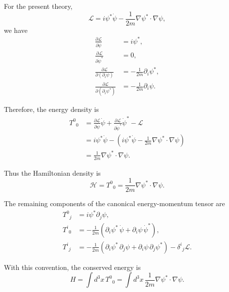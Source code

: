 \documentclass{article}
\newcommand{\lagrangian}{\mathcal{L}}
\begin{document}
For the present theory,
\begin{equation}
\lagrangian
=
i\psi^*\dot{\psi}
-
\frac{1}{2m}\nabla\psi^*\cdot\nabla\psi ,
\end{equation}
we have
\begin{equation}
\begin{split}
\frac{\partial \lagrangian}{\partial \dot{\psi}}
&=
i\psi^*,
\\
\frac{\partial \lagrangian}{\partial \dot{\psi}^*}
&=
0,
\\
\frac{\partial \lagrangian}{\partial(\partial_i\psi)}
&=
-\frac{1}{2m}\partial_i\psi^*,
\\
\frac{\partial \lagrangian}{\partial(\partial_i\psi^*)}
&=
-\frac{1}{2m}\partial_i\psi .
\end{split}
\end{equation}

Therefore, the energy density is
\begin{equation}
\begin{split}
T^0{}_0
&=
\frac{\partial \lagrangian}{\partial \dot{\psi}}\dot{\psi}
+
\frac{\partial \lagrangian}{\partial \dot{\psi}^*}\dot{\psi}^*
-
\lagrangian
\\
&=
i\psi^*\dot{\psi}
-
\left(
i\psi^*\dot{\psi}
-
\frac{1}{2m}\nabla\psi^*\cdot\nabla\psi
\right)
\\
&=
\frac{1}{2m}\nabla\psi^*\cdot\nabla\psi .
\end{split}
\end{equation}

Thus the Hamiltonian density is
\begin{equation}
\mathcal H
=
T^0{}_0
=
\frac{1}{2m}\nabla\psi^*\cdot\nabla\psi .
\end{equation}

The remaining components of the canonical energy-momentum tensor are
\begin{equation}
\begin{split}
T^0{}_j
&=
i\psi^*\partial_j\psi ,
\\
T^i{}_0
&=
-\frac{1}{2m}
\left(
\partial_i\psi^*\,\dot{\psi}
+
\partial_i\psi\,\dot{\psi}^*
\right),
\\
T^i{}_j
&=
-\frac{1}{2m}
\left(
\partial_i\psi^*\,\partial_j\psi
+
\partial_i\psi\,\partial_j\psi^*
\right)
-
\delta^i{}_j\lagrangian .
\end{split}
\end{equation}

With this convention, the conserved energy is
\begin{equation}
H
=
\int d^3x\,T^0{}_0
=
\int d^3x\,
\frac{1}{2m}\nabla\psi^*\cdot\nabla\psi .
\end{equation}
\end{document}
